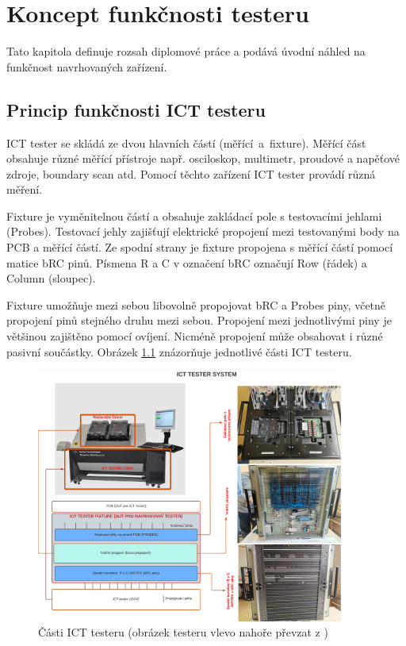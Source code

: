 \chapter{Koncept funkčnosti testeru}
    Tato kapitola definuje rozsah diplomové práce a podává úvodní náhled na funkčnost navrhovaných zařízení.

\section{Princip funkčnosti ICT testeru}
    ICT tester se skládá ze dvou hlavních částí \mbox{(měřící a fixture).}
    Měřící část obsahuje různé měřící přístroje např.
    osciloskop, multimetr, proudové a napěťové zdroje, boundary scan atd.
    Pomocí těchto zařízení ICT tester provádí různá měření.\par

    Fixture je vyměnitelnou částí a obsahuje zakládací pole s testovacími jehlami (Probes).
    Testovací jehly zajišťují elektrické propojení mezi testovanými body na PCB a měřící částí.
    Ze spodní strany je fixture propojena s měřící částí pomocí matice bRC pinů.
    Písmena R a C v označení bRC označují Row (řádek) a Column (sloupec).\par

    Fixture umožňuje mezi sebou libovolně propojovat bRC a Probes piny, včetně propojení pinů stejného druhu mezi sebou.
    Propojení mezi jednotlivými piny je většinou zajištěno pomocí ovíjení.
    Nicméně propojení může obsahovat i různé pasivní součástky.
    Obrázek \ref{fig:ICT_tester} znázorňuje jednotlivé části ICT testeru\cite{ICTkeysight}\cite{ICT_picture}.

    \begin{figure}[ht]
    \centering
    \includegraphics[width=0.9\textwidth]{obrazky/ICT_tester.png}
    \caption{Části ICT testeru (obrázek testeru vlevo nahoře převzat z \cite{ICT_picture})}
    \label{fig:ICT_tester}
    \end{figure}
    \clearpage


